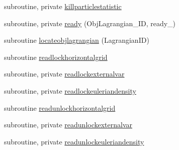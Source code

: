 \begin{DoxyCompactItemize}
\item 
subroutine, private \mbox{\hyperlink{namespacemodulelagrangian_acabd7df16f5abd0459a4a8e198526f3d}{killparticlestatistic}}
\item 
subroutine, private \mbox{\hyperlink{namespacemodulelagrangian_a4ddfbe58c1df4477f8d84db54b330823}{ready}} (Obj\+Lagrangian\+\_\+\+ID, ready\+\_\+)
\item 
subroutine \mbox{\hyperlink{namespacemodulelagrangian_a42e447276e6e4455d7699fb38f9d67f0}{locateobjlagrangian}} (Lagrangian\+ID)
\item 
subroutine \mbox{\hyperlink{namespacemodulelagrangian_a94ace2d6de2898ec24d8cd3f4ccd1292}{readlockhorizontalgrid}}
\item 
subroutine, private \mbox{\hyperlink{namespacemodulelagrangian_a1be97a0d8bb95c907adf6f985c3a70ce}{readlockexternalvar}}
\item 
subroutine, private \mbox{\hyperlink{namespacemodulelagrangian_a3d2b3737568ce2b7e2998cbd2192c685}{readlockeuleriandensity}}
\item 
subroutine \mbox{\hyperlink{namespacemodulelagrangian_ae9f8ce72f32e9ce362df2b72ff4b672d}{readunlockhorizontalgrid}}
\item 
subroutine, private \mbox{\hyperlink{namespacemodulelagrangian_afc1c234aa5939835cbe1bc80abe16766}{readunlockexternalvar}}
\item 
subroutine, private \mbox{\hyperlink{namespacemodulelagrangian_a62c1768ee36cf2fc50c44c595fbf0408}{readunlockeuleriandensity}}
\end{DoxyCompactItemize}
